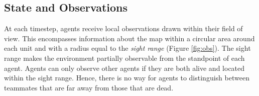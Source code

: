 \documentclass[twoside,11pt]{article}
\begin{document}
\begin{table*}
	\caption{SMAC challenges. Note that list of SMAC scenarios has been updated from the earlier version. All scenarios, however, are still available in the repository.}
	\label{tab:scenario}
\end{table*}

\subsection{State and Observations}\label{section:state_and_obs}

At each timestep, agents receive local observations drawn within their field of view. This  encompasses information about the map within a circular area around each unit and with a radius equal to the \textit{sight range} (Figure \ref{fig:obs}). The sight range makes the environment partially observable from the standpoint of each agent. Agents can only observe other agents if they are both alive and located within the sight range. Hence, there is no way for agents to distinguish between teammates that are far away from those that are dead.
\end{document}
